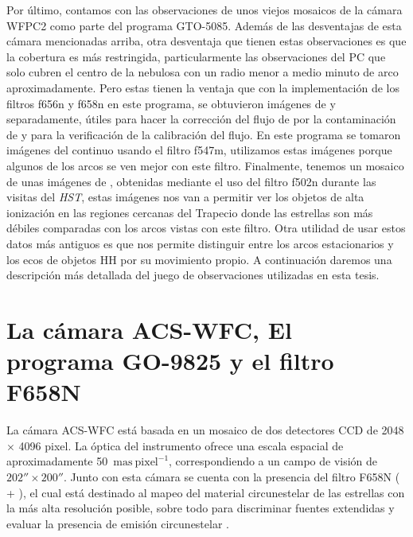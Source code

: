 Por último, contamos con las observaciones de unos viejos mosaicos de la cámara WFPC2 como parte del programa GTO-5085. Además de las desventajas de esta cámara mencionadas arriba, otra desventaja que tienen estas observaciones es que la cobertura es más restringida, particularmente las observaciones del PC que solo cubren el centro de la nebulosa con un radio menor a medio minuto de arco aproximadamente. Pero estas tienen la ventaja que con la implementación de los filtros f656n y f658n en este programa, se obtuvieron imágenes de \ha{} y \nii{} separadamente, útiles para hacer la corrección del flujo de \ha{} por la contaminación de \nii{} y para la verificación de la calibración del flujo. En este programa se tomaron imágenes del continuo usando el filtro f547m, utilizamos estas imágenes porque algunos de los arcos se ven mejor con este filtro. Finalmente, tenemos un mosaico de unas imágenes de \oiii{}, obtenidas mediante el uso del filtro f502n durante las visitas del \textit{HST}, estas imágenes nos van a permitir ver los objetos de alta ionización en las regiones cercanas del Trapecio donde las estrellas son más débiles comparadas con los arcos vistas con este filtro. Otra utilidad de usar estos datos más antiguos es que nos permite distinguir entre los arcos estacionarios y los ecos de objetos HH por su movimiento propio. A continuación daremos una descripción más detallada del juego de observaciones utilizadas en esta tesis.        

\section{La cámara ACS-WFC, El programa GO-9825 y el filtro F658N }
\label{sec:acs}

La cámara ACS-WFC está basada en un mosaico de dos detectores CCD de 2048 \(\times\) 4096 pixel. La óptica del instrumento ofrece una escala espacial de aproximadamente 50~\(\mathrm{mas~pixel^{-1}}\), correspondiendo a un campo de visión  de \(202'' \times 200''\). Junto con esta cámara se cuenta con la presencia del filtro F658N (\ha{} + \nii{}), el cual está destinado al mapeo del material circunestelar de las estrellas con la más alta resolución posible, sobre todo para discriminar fuentes extendidas y evaluar la presencia de emisión circunestelar \citep{Robberto:2013a}.\\

